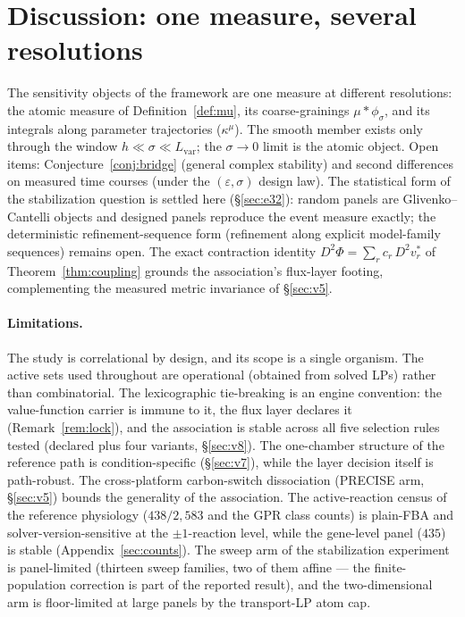 \documentclass[11pt,a4paper]{article}
\theoremstyle{plain}
\theoremstyle{definition}
\theoremstyle{remark}
\newcommand{\kmu}{\kappa^{\mu}}
\begin{document}
\section{Discussion: one measure, several resolutions}
\label{sec:discussion}

The sensitivity objects of the framework are one measure at different
resolutions: the
atomic measure of Definition~\ref{def:mu}, its coarse-grainings
$\mu * \phi_\sigma$, and its integrals along parameter trajectories
($\kmu$). The smooth member exists only through the window
$h \ll \sigma \ll L_{\mathrm{var}}$; the $\sigma \to 0$ limit is the
atomic object. Open items: Conjecture~\ref{conj:bridge} (general complex stability) and second differences on measured time courses (under the $(\varepsilon, \sigma)$ design law). The statistical form of the stabilization question is settled here (\S\ref{sec:e32}): random panels are Glivenko--Cantelli objects and designed panels reproduce the event measure exactly; the deterministic refinement-sequence form (refinement along explicit model-family sequences) remains open.
The exact contraction identity
$D^2\Phi = \sum_r c_r\, D^2 v^*_r$ of Theorem~\ref{thm:coupling}
grounds the association's flux-layer footing, complementing the
measured metric invariance of \S\ref{sec:v5}.

\paragraph{Limitations.}
The study is correlational by design, and its scope is a single
organism. The active sets used throughout are operational (obtained
from solved LPs) rather than combinatorial. The lexicographic
tie-breaking is an engine convention: the value-function carrier is
immune to it, the flux layer declares it (Remark~\ref{rem:lock}), and
the association is stable across all five selection rules tested
(declared plus four variants, \S\ref{sec:v8}). The one-chamber
structure of the reference path is condition-specific
(\S\ref{sec:v7}), while the layer decision itself is path-robust.
The cross-platform carbon-switch dissociation (PRECISE arm,
\S\ref{sec:v5}) bounds the generality of the association. The
active-reaction census of the reference physiology ($438/2{,}583$
and the GPR class counts) is plain-FBA and solver-version-sensitive
at the $\pm 1$-reaction level, while the gene-level panel ($435$) is
stable (Appendix~\ref{sec:counts}). The sweep arm of the
stabilization experiment is panel-limited (thirteen sweep families,
two of them affine --- the finite-population correction is part of
the reported result), and the two-dimensional arm is floor-limited at
large panels by the transport-LP atom cap.
\end{document}
